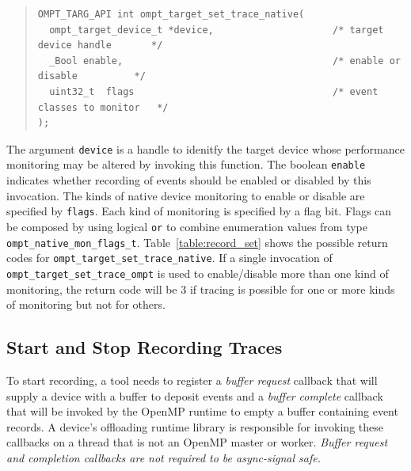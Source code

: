\documentclass{article}
\begin{document}
\begin{quote}
\begin{lstlisting}
OMPT_TARG_API int ompt_target_set_trace_native(
  ompt_target_device_t *device,                     /* target device handle       */
  _Bool enable,                                     /* enable or disable          */
  uint32_t  flags                                   /* event classes to monitor   */
);
\end{lstlisting}
\end{quote}
The argument \lstinline|device| is a handle to idenitfy the target device whose performance monitoring may be altered by invoking this function. 
The boolean \lstinline|enable| indicates whether recording of events should be enabled or disabled by this invocation.
The kinds of native device monitoring to enable or disable are specified by \lstinline|flags|. Each kind of monitoring is specified by a flag bit. Flags can be composed by using logical {\tt or}  to combine enumeration values from type \lstinline|ompt_native_mon_flags_t|.
Table~\ref{table:record_set} shows the possible return codes for \lstinline|ompt_target_set_trace_native|.
If a single invocation of \lstinline|ompt_target_set_trace_ompt| is used to enable/disable more than one kind of monitoring, 
the return code will be 3 if tracing is possible for one or more kinds of monitoring but not for others.

\subsection{Start and Stop Recording Traces}
\label{sec:start-stop-recording}

To start recording, a tool needs to register a \emph{buffer request} callback that will supply a device with a buffer to deposit events and a \emph{buffer complete} callback that will be invoked by the OpenMP runtime to empty a buffer containing event records. A device's offloading runtime library is responsible for invoking these callbacks on a thread that is not an OpenMP master or worker. {\em Buffer request and completion callbacks are not required to  be async-signal safe.}
\end{document}
